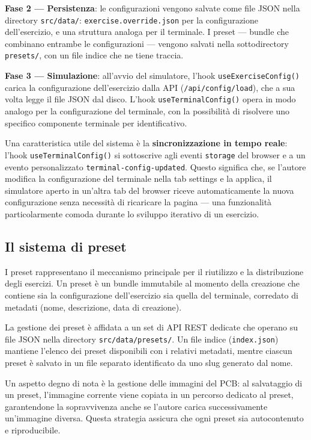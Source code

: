 \textbf{Fase 2 --- Persistenza}: le configurazioni vengono salvate come file JSON nella directory \texttt{src/data/}: \texttt{exercise.override.json} per la configurazione dell'esercizio, e una struttura analoga per il terminale. I preset --- bundle che combinano entrambe le configurazioni --- vengono salvati nella sottodirectory \texttt{presets/}, con un file indice che ne tiene traccia.

\textbf{Fase 3 --- Simulazione}: all'avvio del simulatore, l'hook \texttt{useExerciseConfig()} carica la configurazione dell'esercizio dalla API (\texttt{/api/config/load}), che a sua volta legge il file JSON dal disco. L'hook \texttt{useTerminalConfig()} opera in modo analogo per la configurazione del terminale, con la possibilità di risolvere uno specifico componente terminale per identificativo.

Una caratteristica utile del sistema è la \textbf{sincronizzazione in tempo reale}: l'hook \texttt{useTerminalConfig()} si sottoscrive agli eventi \texttt{storage} del browser e a un evento personalizzato \texttt{terminal-config-updated}. Questo significa che, se l'autore modifica la configurazione del terminale nella tab settings e la applica, il simulatore aperto in un'altra tab del browser riceve automaticamente la nuova configurazione senza necessità di ricaricare la pagina --- una funzionalità particolarmente comoda durante lo sviluppo iterativo di un esercizio.

\subsection{Il sistema di preset}

I preset rappresentano il meccanismo principale per il riutilizzo e la distribuzione degli esercizi. Un preset è un bundle immutabile al momento della creazione che contiene sia la configurazione dell'esercizio sia quella del terminale, corredato di metadati (nome, descrizione, data di creazione).

La gestione dei preset è affidata a un set di API REST dedicate che operano su file JSON nella directory \texttt{src/data/presets/}. Un file indice (\texttt{index.json}) mantiene l'elenco dei preset disponibili con i relativi metadati, mentre ciascun preset è salvato in un file separato identificato da uno slug generato dal nome.

Un aspetto degno di nota è la gestione delle immagini del PCB: al salvataggio di un preset, l'immagine corrente viene copiata in un percorso dedicato al preset, garantendone la sopravvivenza anche se l'autore carica successivamente un'immagine diversa. Questa strategia assicura che ogni preset sia autocontenuto e riproducibile.
